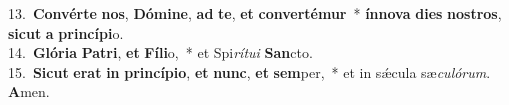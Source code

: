 {13.~}\textbf{Con}\textbf{vér}\textbf{te} \textbf{nos}, \textbf{Dó}\textbf{mi}\textbf{ne}, \textbf{ad} \textbf{te}, \textbf{et} \textbf{con}\textbf{ver}\textbf{té}\textbf{mur}~* \textbf{ín}\textbf{no}\textbf{va} \textbf{di}\textbf{es} \textbf{no}\textbf{stros}, \textbf{si}\textbf{cut} \textbf{a} \textbf{prin}\textbf{cí}\textbf{pi}o.\\
{14.~}\textbf{Gló}\textbf{ri}\textbf{a} \textbf{Pa}\textbf{tri}, \textbf{et} \textbf{Fí}\textbf{li}o,~* et Spi\textit{rí}\textit{tu}\textit{i} \textbf{San}cto.\\
{15.~}\textbf{Si}\textbf{cut} \textbf{e}\textbf{rat} \textbf{in} \textbf{prin}\textbf{cí}\textbf{pi}\textbf{o}, \textbf{et} \textbf{nunc}, \textbf{et} \textbf{sem}per,~* et in sǽcula sæ\textit{cu}\textit{ló}\textit{rum}. \textbf{A}men.\\
